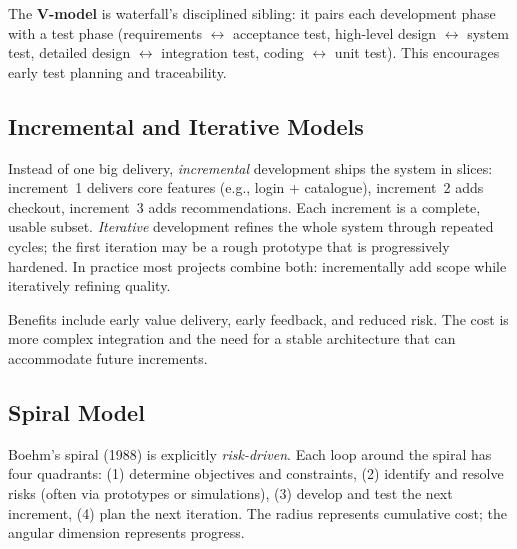 The \textbf{V-model} is waterfall's disciplined sibling: it pairs each development phase with a test phase (requirements $\leftrightarrow$ acceptance test, high-level design $\leftrightarrow$ system test, detailed design $\leftrightarrow$ integration test, coding $\leftrightarrow$ unit test). This encourages early test planning and traceability.

\subsection{Incremental and Iterative Models}

Instead of one big delivery, \emph{incremental} development ships the system in slices: increment~1 delivers core features (e.g., login + catalogue), increment~2 adds checkout, increment~3 adds recommendations. Each increment is a complete, usable subset. \emph{Iterative} development refines the whole system through repeated cycles; the first iteration may be a rough prototype that is progressively hardened. In practice most projects combine both: incrementally add scope while iteratively refining quality.

Benefits include early value delivery, early feedback, and reduced risk. The cost is more complex integration and the need for a stable architecture that can accommodate future increments.

\subsection{Spiral Model}

Boehm's spiral (1988) is explicitly \emph{risk-driven}. Each loop around the spiral has four quadrants: (1) determine objectives and constraints, (2) identify and resolve risks (often via prototypes or simulations), (3) develop and test the next increment, (4) plan the next iteration. The radius represents cumulative cost; the angular dimension represents progress.

